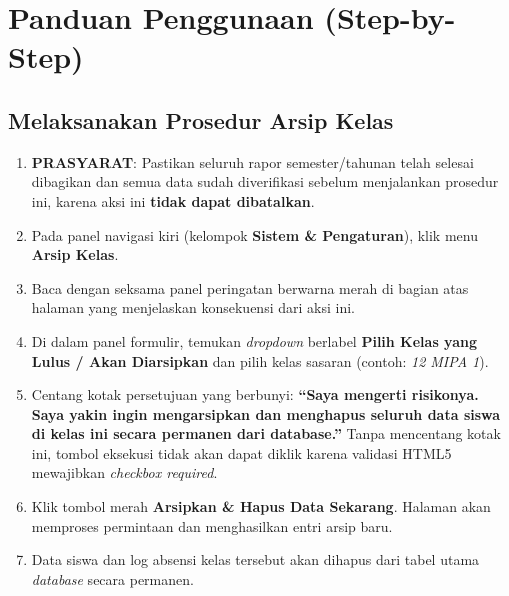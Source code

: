 \section{Panduan Penggunaan (Step-by-Step)}

\subsection{Melaksanakan Prosedur Arsip Kelas}
\begin{enumerate}
    \item \textbf{PRASYARAT}: Pastikan seluruh rapor semester/tahunan telah selesai dibagikan dan semua data sudah diverifikasi sebelum menjalankan prosedur ini, karena aksi ini \textbf{tidak dapat dibatalkan}.
    \item Pada panel navigasi kiri (kelompok \textbf{Sistem \& Pengaturan}), klik menu \textbf{Arsip Kelas}.
    \item Baca dengan seksama panel peringatan berwarna merah di bagian atas halaman yang menjelaskan konsekuensi dari aksi ini.
    \item Di dalam panel formulir, temukan \textit{dropdown} berlabel \textbf{Pilih Kelas yang Lulus / Akan Diarsipkan} dan pilih kelas sasaran (contoh: \textit{12 MIPA 1}).
    \item Centang kotak persetujuan yang berbunyi: \textbf{``Saya mengerti risikonya. Saya yakin ingin mengarsipkan dan menghapus seluruh data siswa di kelas ini secara permanen dari database.''} Tanpa mencentang kotak ini, tombol eksekusi tidak akan dapat diklik karena validasi HTML5 mewajibkan \textit{checkbox required}.
    \item Klik tombol merah \textbf{Arsipkan \& Hapus Data Sekarang}. Halaman akan memproses permintaan dan menghasilkan entri arsip baru.
    \item Data siswa dan log absensi kelas tersebut akan dihapus dari tabel utama \textit{database} secara permanen.
\end{enumerate}

